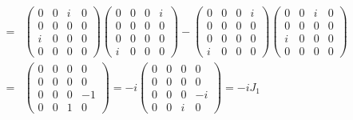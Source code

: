 \documentclass[11pt]{article}
\begin{document}
\begin{eqnarray}
    [k_2,k_3]&=&
    \begin{pmatrix}
        0 & 0 & i & 0\\ 
        0 & 0 & 0 & 0 \\
        i & 0 & 0 & 0 \\
        0 & 0 & 0 & 0
    \end{pmatrix}
    \begin{pmatrix}
        0 & 0 & 0 & i \\
        0 & 0 & 0 & 0 \\
        0 & 0 & 0 & 0 \\
        i & 0 & 0 & 0 
    \end{pmatrix}
    -
    \begin{pmatrix}
        0 & 0 & 0 & i \\
        0 & 0 & 0 & 0 \\
        0 & 0 & 0 & 0 \\
        i & 0 & 0 & 0 
    \end{pmatrix}
    \begin{pmatrix}
        0 & 0 & i & 0\\ 
        0 & 0 & 0 & 0 \\
        i & 0 & 0 & 0 \\
        0 & 0 & 0 & 0
    \end{pmatrix}\\
    &=& 
    \begin{pmatrix}
        0 & 0 & 0 & 0\\
        0 & 0 & 0 & 0 \\
        0 & 0 & 0 & -1 \\
        0 & 0 & 1 & 0
    \end{pmatrix}
    =-i
    \begin{pmatrix}
        0 & 0 & 0 & 0\\
        0 & 0 & 0 & 0 \\
        0 & 0 & 0 & -i \\
        0 & 0 & i & 0
    \end{pmatrix}
    =-iJ_1
\end{eqnarray}
\end{document}
